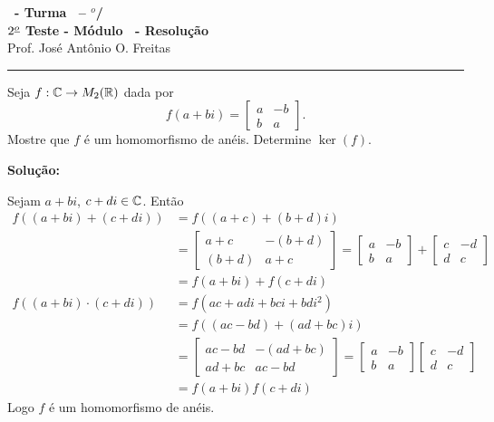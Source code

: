 \documentclass[12pt]{exam}
\begin{document}
\begin{center}
{\Large\bf \disciplina\ - Turma \turma\ -- \semestre$^{o}$/\ano} \\ \vspace{9pt} {\large\bf
$2^{\underline{o}}$ Teste - M\'odulo \modulo\ - Resolu\c{c}\~ao}\\
\vspace{9pt} Prof. Jos{\'e} Ant{\^o}nio O. Freitas
\end{center}
\hrule

\vspace{.6cm}

\questao Seja $f : \mathbb{C} \to M_2(\mathbb{R})$ dada por
\[
	f(a + bi) = \begin{bmatrix}
		a & -b\\
		b & a
	\end{bmatrix}.
\]
Mostre que $f$ \'e um homomorfismo de an\'eis. Determine $\ker(f)$.

\noindent\textbf{Solu\c{c}\~ao:}

Sejam $a + bi$, $c + di \in \mathbb{C}$. Ent\~ao
\begin{align*}
	f((a + bi) + (c + di)) &= f((a + c) + (b + d)i) \\&= \begin{bmatrix}
		a + c & -(b + d)\\
		(b + d) & a + c
	\end{bmatrix} = \begin{bmatrix}
		a & -b\\
		b & a
	\end{bmatrix} + \begin{bmatrix}
		c & -d\\
		d & c
	\end{bmatrix}\\ &= f(a + bi) + f(c + di)\\
	f((a + bi)\cdot (c + di)) &= f(ac + adi + bci + bdi^2) \\ &= f((ac - bd) + (ad + bc)i) \\ &= \begin{bmatrix}
		ac - bd & -(ad + bc)\\
		ad + bc & ac - bd
	\end{bmatrix} = \begin{bmatrix}
		a & -b\\
		b & a
	\end{bmatrix} \begin{bmatrix}
		c & -d\\
		d & c
	\end{bmatrix}\\ &= f(a + bi)f(c + di)
\end{align*}
Logo $f$ \'e um homomorfismo de an\'eis.
\end{document}
